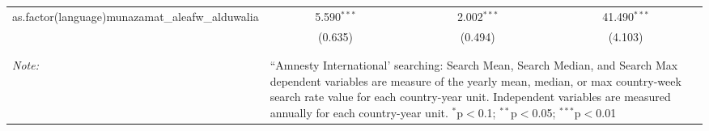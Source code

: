 \begin{table}[!htbp]
\begin{tabular}{@{\extracolsep{5pt}}lccc}
  as.factor(language)munazamat\_aleafw\_alduwalia & 5.590$^{***}$ & 2.002$^{***}$ & 41.490$^{***}$ \\ 
  & (0.635) & (0.494) & (4.103) \\ 
 \hline \\[-1.8ex] 
\hline 
\hline \\[-1.8ex] 
\textit{Note:}  & \multicolumn{3}{l}{\parbox[t]{8cm}{``Amnesty International' searching: Search Mean, Search Median, and Search Max dependent variables are measure of the yearly mean, median, or max country-week search rate value for each country-year unit. Independent variables are measured annually for each country-year unit. $^{*}$p$<$0.1; $^{**}$p$<$0.05; $^{***}$p$<$0.01}} \\ 
\end{tabular} 
\end{table} 
